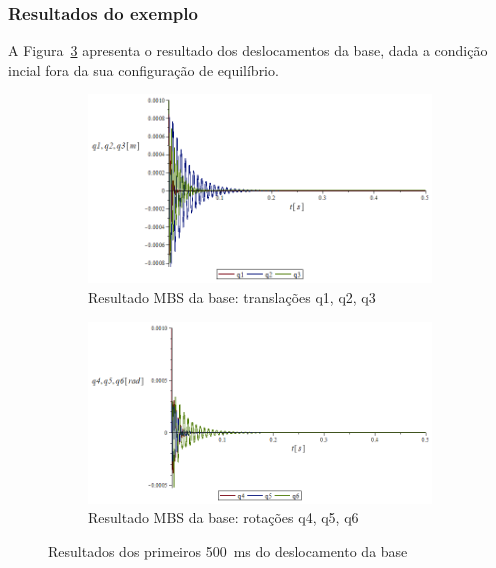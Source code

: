 \subsubsection{Resultados do exemplo}

A Figura~\ref{fig::res_qbase_exemplo} apresenta o resultado dos deslocamentos da
base, dada a condição incial fora da sua configuração de equilíbrio.

\begin{figure}[h]
    \centering
    \begin{subfigure}[b]{0.80\textwidth}
        \includegraphics[width=\textwidth]{figs/q123_base_exemplo}
        \caption{Resultado MBS da base: translações q1, q2, q3}
        \label{fig::q123_base_exemplo}
    \end{subfigure}
    \quad %
    \begin{subfigure}[b]{0.80\textwidth}
        \includegraphics[width=\textwidth]{figs/q456_base_exemplo}
        \caption{Resultado MBS da base: rotações q4, q5, q6}
        \label{fig::q456_base_exemplo}
    \end{subfigure}
    \caption{Resultados dos primeiros 500~ms do deslocamento da base}
    \label{fig::res_qbase_exemplo}
\end{figure}

